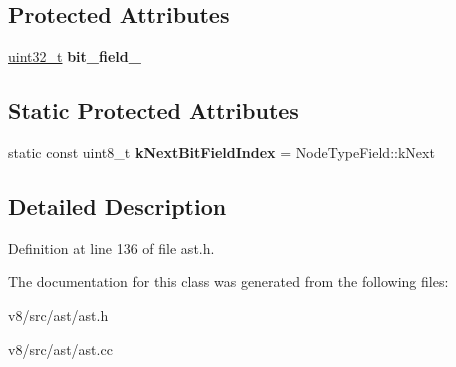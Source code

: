 \subsection*{Protected Attributes}
\begin{DoxyCompactItemize}
\item 
\mbox{\label{classv8_1_1internal_1_1AstNode_a45226472a08d30f2ed552fe22b0790f2}} 
\mbox{\hyperlink{classuint32__t}{uint32\+\_\+t}} {\bfseries bit\+\_\+field\+\_\+}
\end{DoxyCompactItemize}
\subsection*{Static Protected Attributes}
\begin{DoxyCompactItemize}
\item 
\mbox{\label{classv8_1_1internal_1_1AstNode_a7587c0459339bc701a2ace3ce44e2599}} 
static const uint8\+\_\+t {\bfseries k\+Next\+Bit\+Field\+Index} = Node\+Type\+Field\+::k\+Next
\end{DoxyCompactItemize}


\subsection{Detailed Description}


Definition at line 136 of file ast.\+h.



The documentation for this class was generated from the following files\+:\begin{DoxyCompactItemize}
\item 
v8/src/ast/ast.\+h\item 
v8/src/ast/ast.\+cc\end{DoxyCompactItemize}
